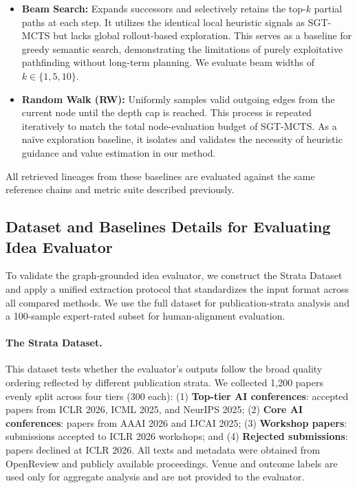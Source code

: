 \documentclass{llmxive}
\begin{document}
\begin{itemize}
\item \textbf{Beam Search:} Expands successors and selectively retains the top-$k$ partial paths at each step. It utilizes the identical local heuristic signals as SGT-MCTS but lacks global rollout-based exploration. This serves as a baseline for greedy semantic search, demonstrating the limitations of purely exploitative pathfinding without long-term planning. We evaluate beam widths of $k \in \{1, 5, 10\}$.
\item \textbf{Random Walk (RW):} Uniformly samples valid outgoing edges from the current node until the depth cap is reached. This process is repeated iteratively to match the total node-evaluation budget of SGT-MCTS. As a naïve exploration baseline, it isolates and validates the necessity of heuristic guidance and value estimation in our method.
\end{itemize}

All retrieved lineages from these baselines are evaluated against the same reference chains and metric suite described previously.

\subsection{Dataset and Baselines Details for Evaluating Idea Evaluator}
\label{app:idea-eval-data}
To validate the graph-grounded idea evaluator, we construct the Strata Dataset and apply a unified extraction protocol that standardizes the input format across all compared methods. We use the full dataset for publication-strata analysis and a 100-sample expert-rated subset for human-alignment evaluation.

\paragraph{The Strata Dataset.}
This dataset tests whether the evaluator's outputs follow the broad quality ordering reflected by different publication strata. We collected 1,200 papers evenly split across four tiers (300 each): (1) \textbf{Top-tier AI conferences}: accepted papers from ICLR 2026, ICML 2025, and NeurIPS 2025; (2) \textbf{Core AI conferences}: papers from AAAI 2026 and IJCAI 2025; (3) \textbf{Workshop papers}: submissions accepted to ICLR 2026 workshops; and (4) \textbf{Rejected submissions}: papers declined at ICLR 2026. All texts and metadata were obtained from OpenReview and publicly available proceedings. Venue and outcome labels are used only for aggregate analysis and are not provided to the evaluator.
\end{document}
